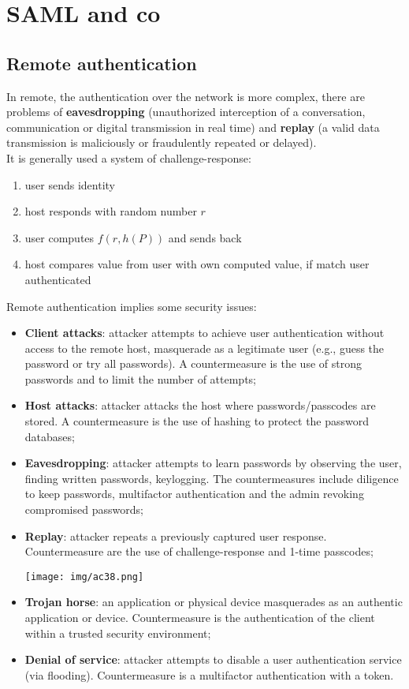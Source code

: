 \documentclass[a4paper, 10pt, titlepage]{article}
\begin{document}
\newpage
\section{SAML and co}
\subsection{Remote authentication}
In remote, the authentication over the network is more complex, there are problems of \textbf{eavesdropping} (unauthorized interception of a conversation, communication or digital transmission in real time) and \textbf{replay} (a valid data transmission is maliciously or fraudulently repeated or delayed). \\
It is generally used a system of challenge-response:
\begin{enumerate}
\item user sends identity
\item host responds with random number $r$
\item user computes $f(r,h(P))$ and sends back
\item host compares value from user with own computed value, if match user authenticated
\end{enumerate}
Remote authentication implies some security issues:
\begin{itemize}
\item \textbf{Client attacks}: attacker attempts to achieve user authentication without access to the remote host, masquerade as a legitimate user (e.g., guess the password or try all passwords). A countermeasure is the use of strong passwords and to limit the number of attempts;
\item \textbf{Host attacks}: attacker attacks the host where passwords/passcodes are stored. A countermeasure is the use of hashing to protect the password databases;
\item \textbf{Eavesdropping}: attacker attempts to learn passwords by observing the user, finding written passwords, keylogging. The countermeasures include diligence to keep passwords, multifactor authentication and the admin revoking compromised passwords;
\item \textbf{Replay}: attacker repeats a previously captured user response. Countermeasure are the use of challenge-response and 1-time passcodes;
\begin{center}
\texttt{[image: img/ac38.png]}
\end{center}
\item \textbf{Trojan horse}: an application or physical device masquerades as an authentic application or device. Countermeasure is the authentication of the client within a trusted security environment;
\item \textbf{Denial of service}: attacker attempts to disable a user authentication service (via flooding). Countermeasure is a multifactor authentication with a token.
\end{itemize}
\end{document}
